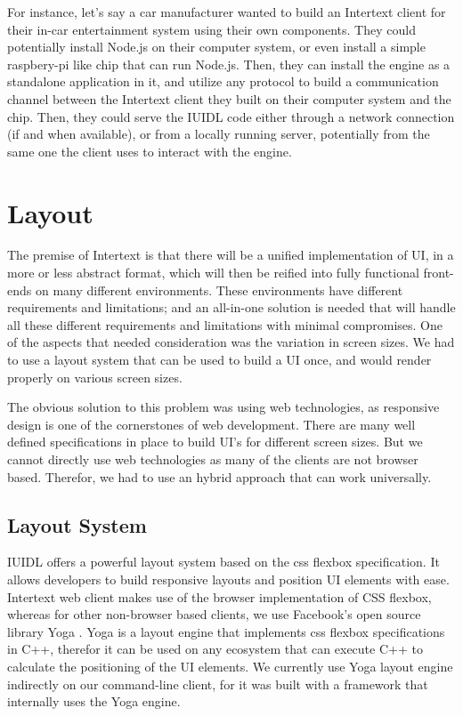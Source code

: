 For instance, let's say a car manufacturer wanted to build an Intertext client for their in-car entertainment system using their own components. They could potentially install Node.js on their computer system, or even install a simple raspbery-pi like chip that can run Node.js. Then, they can install the engine as a standalone application in it, and utilize any protocol to build a communication channel between the Intertext client they built on their computer system and the chip. Then, they could serve the IUIDL code either through a network connection (if and when available), or from a locally running server, potentially from the same one the client uses to interact with the engine. 

\section{Layout}

The premise of Intertext is that there will be a unified implementation of UI, in a more or less abstract format, which will then be reified into fully functional front-ends on many different environments. These environments have different requirements and limitations; and an all-in-one solution is needed that will handle all these different requirements and limitations with minimal compromises. One of the aspects that needed consideration was the variation in screen sizes. We had to use a layout system that can be used to build a UI once, and would render properly on various screen sizes.

The obvious solution to this problem was using web technologies, as responsive design is one of the cornerstones of web development. There are many well defined specifications in place to build UI's for different screen sizes. But we cannot directly use web technologies as many of the clients are not browser based. Therefor, we had to use an hybrid approach that can work universally.

\subsection{Layout System}

IUIDL offers a powerful layout system based on the css flexbox specification. It allows developers to build responsive layouts and position UI elements with ease. Intertext web client makes use of the browser implementation of CSS flexbox, whereas for other non-browser based clients, we use Facebook's open source library Yoga \cite{FacebookYoga}. Yoga is a layout engine that implements css flexbox specifications in C++, therefor it can be used on any ecosystem that can execute C++ to calculate the positioning of the UI elements. We currently use Yoga layout engine indirectly on our command-line client, for it was built with a framework that internally uses the Yoga engine.

